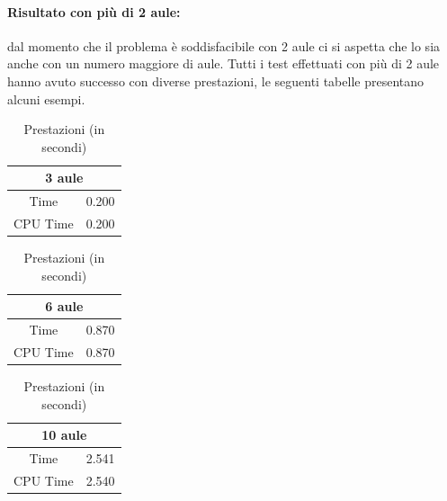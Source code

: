 \documentclass[a4paper,oneside,12pt]{book}
\begin{document}
    \paragraph{Risultato con più di 2 aule:} dal momento che il problema è soddisfacibile con 2 aule ci si aspetta che lo sia anche con un numero maggiore di aule. Tutti i test effettuati con più di 2 aule hanno avuto successo con diverse  prestazioni, le seguenti tabelle presentano alcuni esempi.
    \FloatBarrier
    \begin{table}[h]
        \centering
        \begin{tabular}{|c | c|}
            \multicolumn{2}{c}{\textbf{3 aule}}\\
            \hline
            Time &0.200\\
            \hline
            CPU Time &0.200\\
            \hline
        \end{tabular}
        \centering
        \begin{tabular}{|c | c|}
            \multicolumn{2}{c}{\textbf{6 aule}}\\
            \hline
            Time &0.870\\
            \hline
            CPU Time &0.870\\
            \hline
        \end{tabular}
        \centering
        \begin{tabular}{|c | c|}
            \multicolumn{2}{c}{\textbf{10 aule}}\\
            \hline
            Time &2.541\\
            \hline
            CPU Time &2.540\\
            \hline
        \end{tabular}
        \caption{Prestazioni (in secondi)}
    \end{table}
    \FloatBarrier
    \newpage
\end{document}
